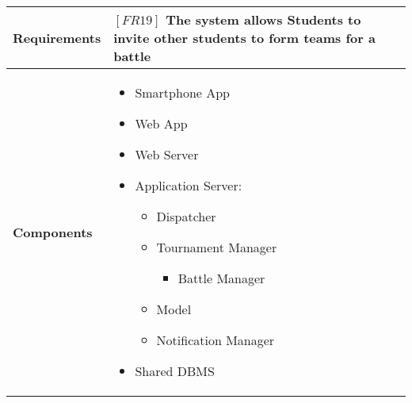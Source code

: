\documentclass{article}
\begin{document}
\begin{table}[H]
 \renewcommand{\arraystretch}{1.5}
    \centering
    \begin{tabular}{|l|p{10cm}|}
        \hline
        \textbf{Requirements} & $[FR19]$ The system allows Students to invite other students to form teams for a battle \\
        \hline
        \textbf{Components} & 
        \begin{itemize}[align=left, topsep=0pt, partopsep=0pt]
            \item Smartphone App
            \item Web App
            \item Web Server
            \item Application Server:
            \begin{itemize}
                \item Dispatcher
                \item Tournament Manager
                \begin{itemize}
                    \item Battle Manager
                \end{itemize}
                \item Model
                \item Notification Manager
            \end{itemize}
            \item Shared DBMS 
        \end{itemize} \\
        \hline
    \end{tabular}
\end{table}
\end{document}

